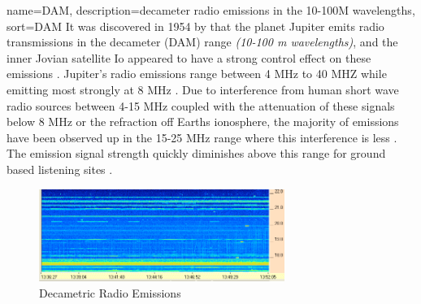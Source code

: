 \documentclass[runningheads,a4paper]{llncs}
\begin{document}
{
  name={DAM},
  description={decameter radio emissions in the 10-100M wavelengths},
  sort=DAM
}
%
It was discovered in 1954 by \cite{burke55} that the planet Jupiter emits radio transmissions in the decameter (\gls{DAM}) range \textit{(10-100 m wavelengths)}, and the inner Jovian satellite Io appeared to have a strong control effect on these emissions \citep{belcher87}. Jupiter's radio emissions range between 4 MHz to 40 MHZ while emitting most strongly at 8 MHz  \citep{wilkinson94}. Due to interference from human short wave radio sources between 4-15 MHz coupled with the attenuation of these signals below 8 MHz or the refraction off Earths ionosphere, the majority of emissions have been observed up in the 15-25 MHz range where this interference is less \citep{wilkinson94}. The emission signal strength quickly diminishes above this range for ground based listening sites \citep{wilkinson94}.
%
\begin{figure}[here]
\centering
\includegraphics[width=8cm]{images/01}
\caption{Decametric Radio Emissions \citep{ashcraft13}}
\label{fig:dam_Emissions}
\end{figure}
%
\end{document}

